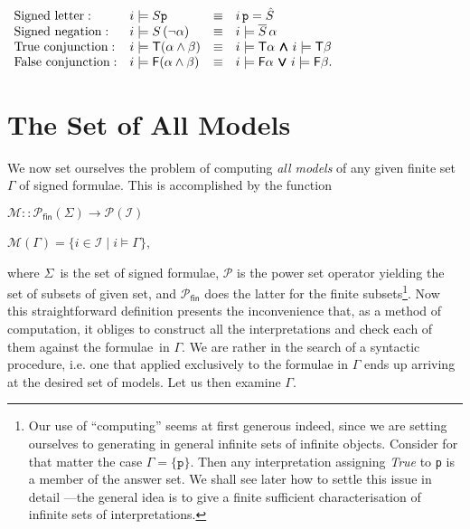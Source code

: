 \documentclass[a4paper,UKenglish]{lipics}
\newcounter{c}
\newcommand{\cnst}[1]{\textsl{#1}}
\newcommand{\lett}[1]{\texttt{#1}}
\newcommand{\sg}[1]{\textsf{#1}}
\newcommand{\sftype}{\ensuremath{\Sigma}}
\newcommand{\mean}[1]{\ensuremath{\hat{#1}}}
\newcommand{\op}[1]{\ensuremath{\overline{#1}}}
\newcommand{\interprt}{\ensuremath{\mathcal{I}}}
\newcommand{\sat}[2]{\ensuremath{#1\models#2}}
\newcommand{\allmodels}{\ensuremath{\mathcal{M}}}
\newcommand{\pow}{\ensuremath{\mathcal{P}}}
\newcommand{\finpow}{\ensuremath{\pow_\mathsf{fin}}}
\newcommand{\iset}[1]{\ensuremath{\{i\in\interprt \mid #1\}}}
\newcommand{\Mwedge}{\ensuremath{{\wedge\hspace{-0.65em}\wedge}\hspace{-0.65em}{\wedge\hspace{-0.65em}\wedge}}}
\newcommand{\Mvee}{\ensuremath{{\vee\hspace{-0.65em}\vee}\hspace{-0.65em}{\vee\hspace{-0.65em}\vee}}}
\begin{document}
$\begin{array}{llll}
\mathrm{Signed\ letter:} & \sat{i}{S\lett{p}} & \equiv & i\,\lett{p} = \mean{S}\\



\mathrm{Signed\ negation:} & \sat{i}{S\,(\neg\alpha)} & \equiv & \sat{i}{\op{S}\,\alpha} \\

\mathrm{True\ conjunction:} & \sat{i}{\sg{T}(\alpha\wedge\beta)} & \equiv & \sat{i}{\sg{T} \alpha}\ \Mwedge \ \sat{i}{\sg{T} \beta} \\

\mathrm{False\ conjunction:} & \sat{i}{\sg{F}(\alpha\wedge\beta)} & \equiv & \sat{i}{\sg{F} \alpha}\ \Mvee \ \sat{i}{\sg{F} \beta}.
\end{array}$







\section{The Set of All Models}
We now set ourselves the problem of computing \emph{all models} of any given finite set $\Gamma$ of signed formulae. This is accomplished by the function

$\allmodels :: \finpow({\sftype}) \rightarrow \pow({\interprt})$

$\allmodels (\Gamma) = \iset{\sat{i}{\Gamma}}$,

\noindent where \sftype\ is the set of signed formulae, \pow{} is the power set operator yielding the set of subsets of given set, and \finpow{} 
does the latter for the finite subsets\footnote{Our use of ``computing'' seems at first generous indeed, since we are setting ourselves to generating in general infinite sets of infinite objects. Consider for that matter the case $\Gamma = \{\lett{p}\}$. Then any interpretation assigning \cnst{True} to \lett{p} is a member of the answer set. We shall see later how to settle this issue in detail ---the general idea is to give a finite sufficient characterisation of infinite sets of interpretations.}.
Now this straightforward definition presents the inconvenience that, as a method of computation, it obliges to construct all the interpretations and check each of them against the formulae\ in $\Gamma$. We are rather in the search of a syntactic procedure, i.e. one that applied exclusively to the formulae in $\Gamma$ ends up arriving at the desired set of models. Let us then examine $\Gamma$.
\end{document}
